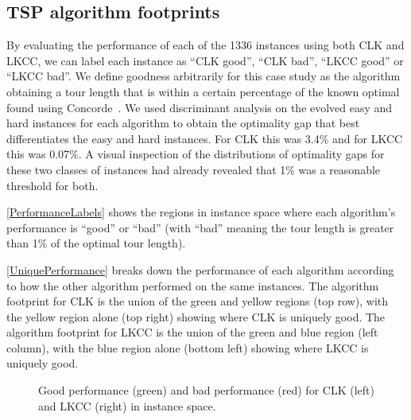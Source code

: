 \documentclass[conference]{IEEEtran}
\begin{document}
\subsection{TSP algorithm footprints}
By evaluating the performance of each of the 1336 instances using both CLK and LKCC, we can label each instance as ``CLK good'', ``CLK bad'', ``LKCC good'' or ``LKCC bad''. We define goodness arbitrarily for this case study as the algorithm obtaining a tour length that is within a certain percentage of the known optimal found using Concorde~\cite{Concorde}. We used discriminant analysis on the evolved easy and hard instances for each algorithm to obtain the optimality gap that best differentiates the easy and hard instances. For CLK this was 3.4\% and for LKCC this was 0.07\%. A visual inspection of the distributions of optimality gaps for these two classes of instances had already revealed that 1\% was a reasonable threshold for both.

\autoref{PerformanceLabels} shows the regions in instance space where each algorithm's performance is ``good'' or ``bad'' (with ``bad'' meaning the tour length is greater than 1\% of the optimal tour length).

\autoref{UniquePerformance} breaks down the performance of each algorithm according to how the other algorithm performed on the same instances. The algorithm footprint for CLK is the union of the green and yellow regions (top row), with the yellow region alone (top right) showing where CLK is uniquely good. The algorithm footprint for LKCC is the union of the green and blue region (left column), with the blue region alone (bottom left) showing where LKCC is uniquely good.

\begin{figure}[!t]
\centering
{}
\qquad
{}
\caption{Good performance (green) and bad performance (red) for CLK (left) and LKCC (right) in instance space.}
\label{PerformanceLabels}
\end{figure}
\end{document}

